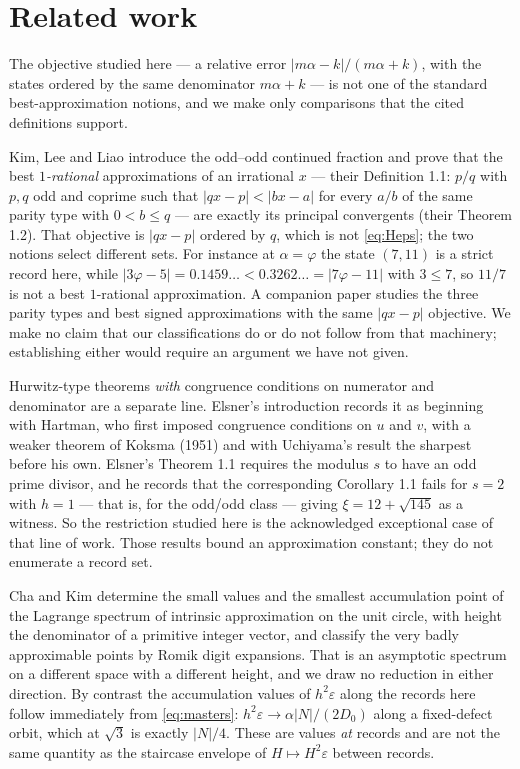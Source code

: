 \documentclass[11pt]{article}
\theoremstyle{definition}
\theoremstyle{remark}
\begin{document}
\section{Related work}\label{sec:related}

The objective studied here --- a relative error $|m\alpha-k|/(m\alpha+k)$, with the states
ordered by the same denominator $m\alpha+k$ --- is not one of the standard best-approximation
notions, and we make only comparisons that the cited definitions support.

Kim, Lee and Liao \cite{KLL2022} introduce the odd--odd continued fraction and prove that the
best \emph{$1$-rational} approximations of an irrational $x$ --- their Definition 1.1: $p/q$
with $p,q$ odd and coprime such that $|qx-p|<|bx-a|$ for every $a/b$ of the same parity type
with $0<b\le q$ --- are exactly its principal convergents (their Theorem 1.2). That objective is
$|qx-p|$ ordered by $q$, which is not \eqref{eq:Heps}; the two notions select different sets.
For instance at $\alpha=\varphi$ the state $(7,11)$ is a strict record here, while
$|3\varphi-5|=0.1459\ldots<0.3262\ldots=|7\varphi-11|$ with $3\le7$, so $11/7$ is not a best
$1$-rational approximation. A companion paper \cite{KLL2025} studies the three parity types and
best signed approximations with the same $|qx-p|$ objective. We make no claim that our
classifications do or do not follow from that machinery; establishing either would require an
argument we have not given.

Hurwitz-type theorems \emph{with} congruence conditions on numerator and denominator are a
separate line. Elsner's introduction \cite{Elsner} records it as beginning with Hartman, who
first imposed congruence conditions on $u$ and $v$, with a weaker theorem of Koksma (1951) and
with Uchiyama's result the sharpest before his own. Elsner's Theorem 1.1 requires the modulus
$s$ to have an odd prime divisor, and he records that the corresponding Corollary 1.1 fails for
$s=2$ with $h=1$ --- that is, for the odd/odd class --- giving $\xi=12+\sqrt{145}$ as a
witness. So the restriction studied here is the acknowledged
exceptional case of that line of work. Those results bound an approximation constant; they do
not enumerate a record set.

Cha and Kim \cite{ChaKim} determine the small values and the smallest accumulation point of the
Lagrange spectrum of intrinsic approximation on the unit circle, with height the denominator of
a primitive integer vector, and classify the very badly approximable points by Romik digit
expansions. That is an asymptotic spectrum on a different space with a different height, and we
draw no reduction in either direction. By contrast the accumulation values of
$h^2\varepsilon$ along the records here follow immediately from \eqref{eq:masters}:
$h^2\varepsilon\to\alpha|N|/(2D_0)$ along a fixed-defect orbit, which at $\sqrt3$ is exactly
$|N|/4$. These are values \emph{at} records and are not the same quantity as the staircase
envelope of $H\mapsto H^2\varepsilon$ between records.
\end{document}
